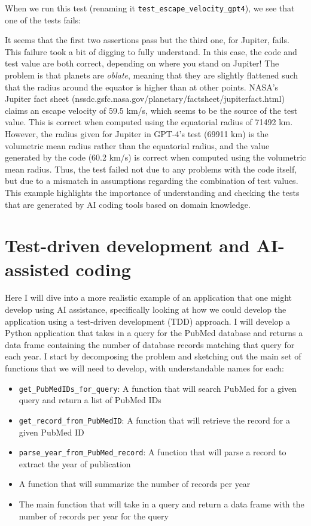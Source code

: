 When we run this test (renaming it \texttt{test\_escape\_velocity\_gpt4}), we see that one of the tests fails:



It seems that the first two assertions pass but the third one, for Jupiter, fails.
This failure took a bit of digging to fully understand.
In this case, the code and test value are both correct, depending on where you stand on Jupiter! The problem is that planets are \textit{oblate}, meaning that they are slightly flattened such that the radius around the equator is higher than at other points.
NASA's Jupiter fact sheet (nssdc.gsfc.nasa.gov/planetary/factsheet/jupiterfact.html) claims an escape velocity of 59.5 km/s, which seems to be the source of the test value.
This is correct when computed using the equatorial radius of 71492 km.
However, the radius given for Jupiter in GPT-4's test (69911 km) is the volumetric mean radius rather than the equatorial radius, and the value generated by the code (60.2 km/s) is correct when computed using the volumetric mean radius.
Thus, the test failed not due to any problems with the code itself, but due to a mismatch in assumptions regarding the combination of test values.
This example highlights the importance of understanding and checking the tests that are generated by AI coding tools based on domain knowledge.


\section{Test-driven development and AI-assisted coding}

Here I will dive into a more realistic example of an application that one might develop using AI assistance, specifically looking at how we could develop the application using a test-driven development (TDD) approach.
I will develop a Python application that takes in a query for the PubMed database and returns a data frame containing the number of database records matching that query for each year.
I start by decomposing the problem and sketching out the main set of functions that we will need to develop, with understandable names for each:

\begin{itemize}
\item \texttt{get\_PubMedIDs\_for\_query}: A function that will search PubMed for a given query and return a list of PubMed IDs
\item \texttt{get\_record\_from\_PubMedID}: A function that will retrieve the record for a given PubMed ID
\item \texttt{parse\_year\_from\_PubMed\_record}: A function that will parse a record to extract the year of publication
\item A function that will summarize the number of records per year
\item The main function that will take in a query and return a data frame with the number of records per year for the query
\end{itemize}

